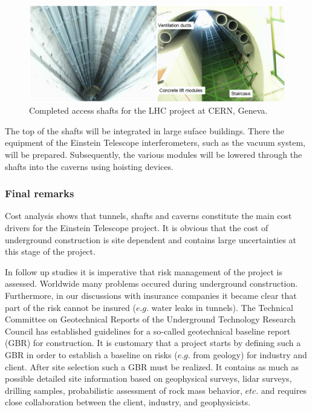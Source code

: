 \begin{figure}[htbp!]
\centering
\includegraphics[width=16cm]{./Sec_SiteInfra/Figures/cmsshaft.jpg}
\caption{Completed access shafts for the LHC project at CERN, Geneva.}
\label{fig:cmsshaft}
\end{figure}
The top of the shafts will be integrated in large suface buildings. There
the equipment of the Einstein Telescope interferometers, such as the vacuum system, will
be prepared. Subsequently, the various modules will be lowered through the
shafts into the caverns using hoisting devices.

\FloatBarrier
\subsubsection{Final remarks}

Cost analysis shows that tunnels, shafts and caverns constitute the main cost drivers 
for the Einstein Telescope project. It is obvious that the cost of underground construction is site dependent
and contains large uncertainties at this stage of the project.

In follow up studies it is imperative that risk management of the project is assessed.
Worldwide many problems occured during underground construction. Furthermore,
in our discussions with insurance companies it became clear that part of the
risk cannot be insured ($e.g.$ water leaks in tunnels). The Technical Committee on
Geotechnical Reports of the Underground Technology Research Council has
established guidelines for a so-called geotechnical baseline report (GBR) for construction.
It is customary that a project starts by defining such a GBR in order to establish
a baseline on risks ($e.g.$ from geology) for industry and client. After
site selection such a GBR must be realized. It contains as much as possible detailed
site information based on geophysical surveys, lidar surveys, drilling samples,
probabilistic assessment of rock mass behavior, $etc.$ and requires close collaboration
between the client, industry, and geophysicists.

